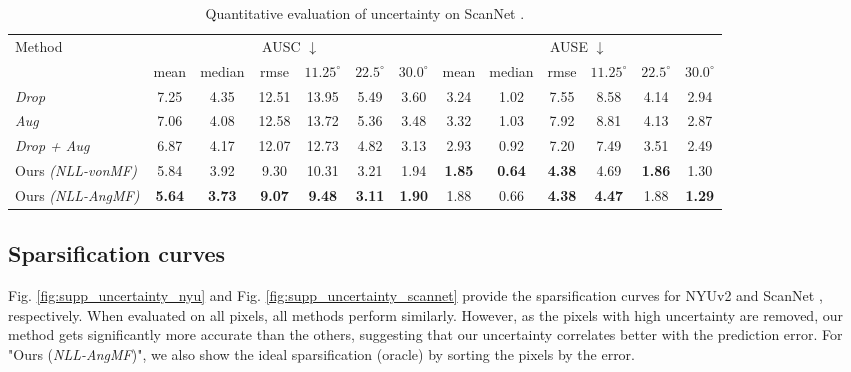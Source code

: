 \documentclass[10pt,twocolumn,letterpaper]{article}
\begin{document}
\begin{table}[h]
\normalsize
\setlength\tabcolsep{1.5pt}
\begin{center}
\begin{tabular}{l|cccccc|cccccc}
\toprule
\multirow{2}{4em}{Method} & \multicolumn{6}{c|}{\small AUSC $\downarrow$} &
\multicolumn{6}{c}{\small AUSE $\downarrow$}\\
\cline{2-13}
& {\small mean} & {\small median} & {\small rmse} & {\footnotesize $11.25^{\circ}$} & {\footnotesize $22.5^{\circ}$} & {\footnotesize $30.0^{\circ}$} & {\small mean} & {\small median} & {\small rmse} & {\footnotesize $11.25^{\circ}$} & {\footnotesize $22.5^{\circ}$} & {\footnotesize $30.0^{\circ}$}\\
\midrule
\textit{Drop} 
& 7.25 & 4.35 & 12.51 & 13.95 & 5.49 & 3.60
& 3.24 & 1.02 & 7.55 & 8.58 & 4.14 & 2.94\\
\textit{Aug} 
& 7.06 & 4.08 & 12.58 & 13.72 & 5.36 & 3.48
& 3.32 & 1.03 & 7.92 & 8.81 & 4.13 & 2.87\\
\textit{Drop + Aug} 
& 6.87 & 4.17 & 12.07 & 12.73 & 4.82 & 3.13
& 2.93 & 0.92 & 7.20 & 7.49 & 3.51 & 2.49\\
\hline
Ours \textit{(NLL-vonMF)} 
& 5.84 & 3.92 & 9.30 & 10.31 & 3.21 & 1.94
& \textbf{1.85} & \textbf{0.64} & \textbf{4.38} & 4.69 & \textbf{1.86} & 1.30\\
Ours \textit{(NLL-AngMF)} 
& \textbf{5.64} & \textbf{3.73} & \textbf{9.07} & \textbf{9.48} & \textbf{3.11} & \textbf{1.90}
& 1.88 & 0.66 & \textbf{4.38} & \textbf{4.47} & 1.88 & \textbf{1.29}\\
\bottomrule
\end{tabular}
\end{center}
\caption{Quantitative evaluation of uncertainty on ScanNet \cite{ScanNet}.}
\label{table:supp_uncertainty-scannet}
\end{table}

\newpage
\subsection{Sparsification curves}

Fig. \ref{fig:supp_uncertainty_nyu} and Fig. \ref{fig:supp_uncertainty_scannet} provide the sparsification curves for NYUv2 \cite{NYUv2} and ScanNet \cite{ScanNet}, respectively. When evaluated on all pixels, all methods perform similarly. However, as the pixels with high uncertainty are removed, our method gets significantly more accurate than the others, suggesting that our uncertainty correlates better with the prediction error. For "Ours (\textit{NLL-AngMF})", we also show the ideal sparsification (oracle) by sorting the pixels by the error.
\end{document}
